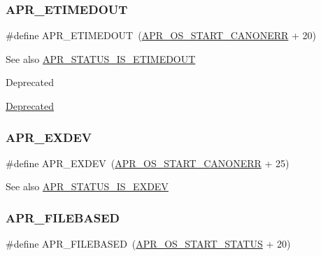 \subsubsection{\texorpdfstring{A\+P\+R\+\_\+\+E\+T\+I\+M\+E\+D\+O\+UT}{APR\_ETIMEDOUT}}
{\footnotesize\ttfamily \#define A\+P\+R\+\_\+\+E\+T\+I\+M\+E\+D\+O\+UT~(\mbox{\hyperlink{group__apr__errno_ga7bca957c11b80b31cb54b0d2cbe9e025}{A\+P\+R\+\_\+\+O\+S\+\_\+\+S\+T\+A\+R\+T\+\_\+\+C\+A\+N\+O\+N\+E\+RR}} + 20)}

\begin{DoxySeeAlso}{See also}
\mbox{\hyperlink{group___a_p_r___s_t_a_t_u_s___i_s_ga6adc2f539eabedb504294458be4f6251}{A\+P\+R\+\_\+\+S\+T\+A\+T\+U\+S\+\_\+\+I\+S\+\_\+\+E\+T\+I\+M\+E\+D\+O\+UT}} 
\end{DoxySeeAlso}
\begin{DoxyRefDesc}{Deprecated}
\item[\mbox{\hyperlink{deprecated__deprecated000001}{Deprecated}}]\end{DoxyRefDesc}
\mbox{\label{group___a_p_r___error_ga0562023bd8ebe580b9bbb9f7b04d3f5d}} 
\subsubsection{\texorpdfstring{A\+P\+R\+\_\+\+E\+X\+D\+EV}{APR\_EXDEV}}
{\footnotesize\ttfamily \#define A\+P\+R\+\_\+\+E\+X\+D\+EV~(\mbox{\hyperlink{group__apr__errno_ga7bca957c11b80b31cb54b0d2cbe9e025}{A\+P\+R\+\_\+\+O\+S\+\_\+\+S\+T\+A\+R\+T\+\_\+\+C\+A\+N\+O\+N\+E\+RR}} + 25)}

\begin{DoxySeeAlso}{See also}
\mbox{\hyperlink{group___a_p_r___s_t_a_t_u_s___i_s_ga1a11d6ff007e40f93f9db1b3c6e76617}{A\+P\+R\+\_\+\+S\+T\+A\+T\+U\+S\+\_\+\+I\+S\+\_\+\+E\+X\+D\+EV}} 
\end{DoxySeeAlso}
\mbox{\label{group___a_p_r___error_ga28a6d59b62d2698208451a9343399fbb}} 
\subsubsection{\texorpdfstring{A\+P\+R\+\_\+\+F\+I\+L\+E\+B\+A\+S\+ED}{APR\_FILEBASED}}
{\footnotesize\ttfamily \#define A\+P\+R\+\_\+\+F\+I\+L\+E\+B\+A\+S\+ED~(\mbox{\hyperlink{group__apr__errno_ga450e1a5734732e092ddaa5b67414f69b}{A\+P\+R\+\_\+\+O\+S\+\_\+\+S\+T\+A\+R\+T\+\_\+\+S\+T\+A\+T\+US}} + 20)}

